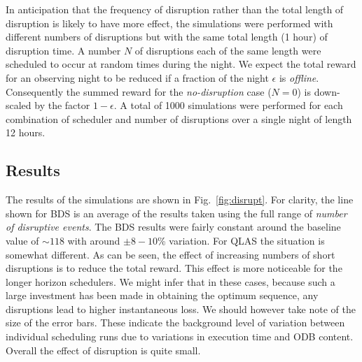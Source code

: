 In anticipation that the frequency of disruption rather than the total length of disruption is likely to have more effect, the simulations were performed with different numbers of disruptions but with the same total length (1 hour) of disruption time. A number $N$ of disruptions each of the same length were scheduled to occur at random times during the night. We expect the total reward for an observing night to be reduced if a fraction of the night $\epsilon$ is \emph{offline}. Consequently the summed reward for the \emph{no-disruption} case ($N = 0$) is down-scaled by the factor $1-\epsilon$. A total of 1000 simulations were performed for each combination of scheduler and number of disruptions over a single night of length 12 hours.

\subsection{Results}
The results of the simulations are shown in Fig.~\ref{fig:disrupt}. For clarity, the line shown for BDS is an average of the results taken using the full range of \emph{number of disruptive events}. The BDS results were fairly constant around the baseline value of $\sim 118$ with around $\pm 8-10$\% variation. For QLAS the situation is somewhat different. As can be seen, the effect of increasing numbers of short disruptions is to reduce the total reward. This effect is more noticeable for the longer horizon schedulers. We might infer that in these cases, because such a large investment has been made in obtaining the optimum sequence, any disruptions lead to higher instantaneous loss. We should however take note of the size of the error bars. These indicate the background level of variation between individual scheduling runs due to variations in execution time and ODB content. Overall the effect of disruption is quite small.

